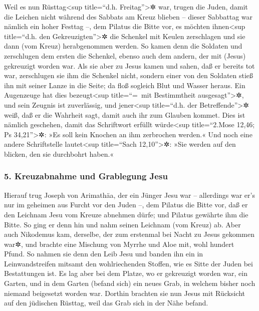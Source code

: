  Weil es nun Rüsttag\textless sup title=``d.h.
Freitag''\textgreater✲ war, trugen die Juden, damit die Leichen nicht
während des Sabbats am Kreuz blieben -- dieser Sabbattag war nämlich ein
hoher Festtag --, dem Pilatus die Bitte vor, es möchten
ihnen\textless sup title=``d.h. den Gekreuzigten''\textgreater✲ die
Schenkel mit Keulen zerschlagen und sie dann (vom Kreuz) herabgenommen
werden.  So kamen denn die Soldaten und zerschlugen dem
ersten die Schenkel, ebenso auch dem andern, der mit (Jesus) gekreuzigt
worden war.  Als sie aber zu Jesus kamen und sahen, daß
er bereits tot war, zerschlugen sie ihm die Schenkel nicht,
 sondern einer von den Soldaten stieß ihn mit seiner
Lanze in die Seite; da floß sogleich Blut und Wasser heraus.
 Ein Augenzeuge hat dies bezeugt\textless sup
title=``=~mit Bestimmtheit ausgesagt''\textgreater✲, und sein Zeugnis
ist zuverlässig, und jener\textless sup title=``d.h. der
Betreffende''\textgreater✲ weiß, daß er die Wahrheit sagt, damit auch
ihr zum Glauben kommet.  Dies ist nämlich geschehen,
damit das Schriftwort erfüllt würde\textless sup title=``2.Mose 12,46;
Ps 34,21''\textgreater✲: »Es soll kein Knochen an ihm zerbrochen
werden.«  Und noch eine andere Schriftstelle
lautet\textless sup title=``Sach 12,10''\textgreater✲: »Sie werden auf
den blicken, den sie durchbohrt haben.«

\hypertarget{kreuzabnahme-und-grablegung-jesu}{%
\subsubsection{5. Kreuzabnahme und Grablegung
Jesu}\label{kreuzabnahme-und-grablegung-jesu}}

 Hierauf trug Joseph von Arimathäa, der ein Jünger Jesu
war -- allerdings war er's nur im geheimen aus Furcht vor den Juden --,
dem Pilatus die Bitte vor, daß er den Leichnam Jesu vom Kreuze abnehmen
dürfe; und Pilatus gewährte ihm die Bitte. So ging er denn hin und nahm
seinen Leichnam (vom Kreuz) ab.  Aber auch Nikodemus kam,
derselbe, der zum erstenmal bei Nacht zu Jesus gekommen war✲, und
brachte eine Mischung von Myrrhe und Aloe mit, wohl hundert Pfund.
 So nahmen sie denn den Leib Jesu und banden ihn ein in
Leinwandstreifen mitsamt den wohlriechenden Stoffen, wie es Sitte der
Juden bei Bestattungen ist.  Es lag aber bei dem Platze,
wo er gekreuzigt worden war, ein Garten, und in dem Garten (befand sich)
ein neues Grab, in welchem bisher noch niemand beigesetzt worden war.
 Dorthin brachten sie nun Jesus mit Rücksicht auf den
jüdischen Rüsttag, weil das Grab sich in der Nähe befand.


